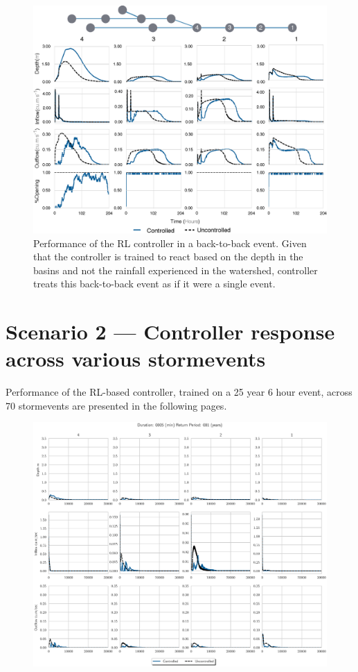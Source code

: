 \begin{figure}[H]
    \centering
    \includegraphics[width=\linewidth]{RL-SI-figures/b2b.eps}
    \caption{Performance of the RL controller in a back-to-back event. Given that the controller is trained to react based on the depth in the basins and not the rainfall experienced in the watershed, controller treats this back-to-back event as if it were a single event.}\label{fig:10}
\end{figure}




\newpage

\section{Scenario 2 --- Controller response across various stormevents}

Performance of the RL-based controller, trained on a 25 year 6 hour event, across 70 stormevents are presented in the following pages.


\begin{figure}[ht]
    \includegraphics[width=\linewidth]{./RL-SI-figures/77storms/0005001.eps}
\end{figure}



